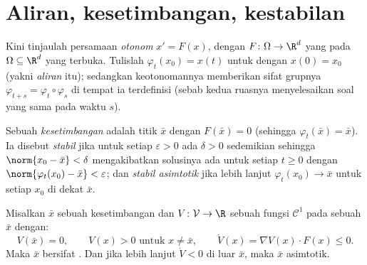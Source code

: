 \section{Aliran, kesetimbangan, kestabilan}

Kini tinjaulah persamaan \emph{otonom} $x' = F(x)$, dengan $F
\colon \Omega \to \R^d$ yang  pada $\Omega
\subseteq \R^d$ yang terbuka. Tulislah $\varphi_t(x_0) = x(t)$ untuk
 dengan $x(0) = x_0$ (yakni
\emph{aliran} itu); sedangkan keotonomannya memberikan
sifat grupnya $\varphi_{t+s} =
\varphi_t\circ\varphi_s$ di tempat ia terdefinisi (sebab kedua ruasnya menyelesaikan
soal yang sama pada waktu $s$).

\begin{definition}\label{def:b3:ode:stability}
Sebuah \emph{kesetimbangan} adalah titik $\bar x$ dengan $F(\bar x) =
0$ (sehingga $\varphi_t(\bar x) = \bar x$). Ia disebut
\emph{stabil} jika untuk setiap
$\varepsilon > 0$ ada $\delta > 0$ sedemikian sehingga
$\norm{x_0 - \bar x} < \delta$ mengakibatkan solusinya
ada untuk setiap $t \geq 0$ dengan $\norm{\varphi_t(x_0) - \bar
x} < \varepsilon$; dan \emph{stabil asimtotik} jika lebih lanjut
$\varphi_t(x_0) \to \bar x$ untuk setiap $x_0$ di dekat $\bar x$.
\end{definition}

\begin{theorem}\label{thm:b3:ode:lyapunov}
Misalkan $\bar x$ sebuah kesetimbangan dan $V \colon \mathcal V \to
\R$ sebuah fungsi $\mathcal C^1$ pada sebuah  $\bar x$
dengan:
\[
V(\bar x) = 0,\qquad V(x) > 0 \text{ untuk } x \neq \bar x,
\qquad \dot V(x) = \nabla V(x)\cdot F(x) \leq 0 .
\]
Maka $\bar x$ bersifat . Dan jika lebih lanjut $\dot V < 0$ di luar $\bar
x$, maka $\bar x$  asimtotik.
\end{theorem}

